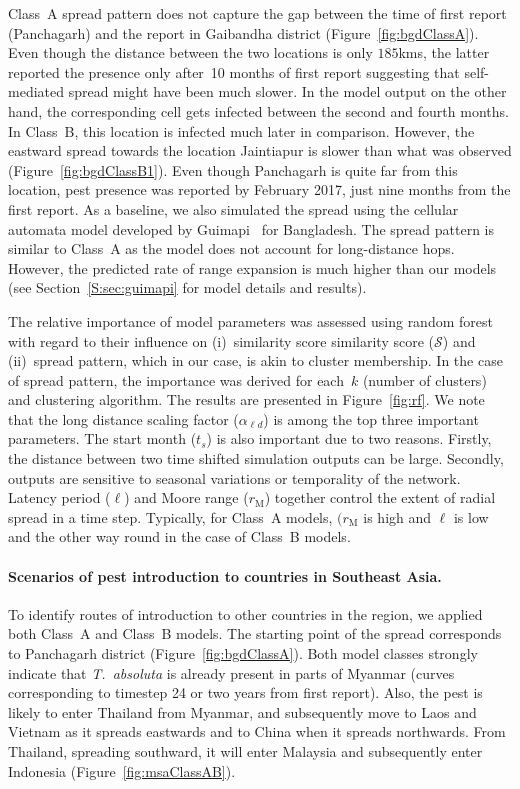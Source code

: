 \documentclass[11pt]{article}
\newcommand{\tuta}{\emph{T.~absoluta}}
\newcommand{\similarity}{\mathcal{S}}
\newcommand{\ald}{\alpha_{\ell d}}
\newcommand{\mooreRange}{r_\mathrm{M}}
\theoremstyle{definition}
\begin{document}
Class~A spread pattern does not capture the gap between the time of first
report (Panchagarh) and the report in Gaibandha district
(Figure~\ref{fig:bgdClassA}). Even though the distance between the two
locations is only $185$kms, the latter reported the presence only after~10
months of first report suggesting that self-mediated spread might have been
much slower. In the model output on the other hand, the corresponding cell
gets infected between the second and fourth months.  In Class~B, this
location is infected much later in comparison. However, the eastward spread
towards the location Jaintiapur is slower than what was observed
(Figure~\ref{fig:bgdClassB1}). Even though Panchagarh is quite far from
this location, pest presence was reported by February 2017, just nine
months from the first report.  As a baseline, we also simulated the spread
using the cellular automata model developed by
Guimapi~\cite{guimapi2016modeling} for Bangladesh. The spread pattern is
similar to Class~A as the model does not account for long-distance hops.
However, the predicted rate of range expansion is much higher than our
models (see Section~\ref{S:sec:guimapi} for model details and results).

The relative importance of model parameters was assessed using random
forest~\cite{breiman2001random} with regard to their influence on
(i)~similarity score similarity score ($\similarity$) and (ii)~spread
pattern, which in our case, is akin to cluster membership. In the case of
spread pattern, the importance was derived for each~$k$ (number of
clusters) and clustering algorithm. The results are presented in
Figure~\ref{fig:rf}. We note that the long distance scaling factor ($\ald$)
is among the top three important parameters. The start month ($t_s$) is
also important due to two reasons. Firstly, the distance between two time
shifted simulation outputs can be large. Secondly, outputs are sensitive to
seasonal variations or temporality of the network.  Latency period ($\ell$)
and Moore range ($\mooreRange$) together control the extent of radial
spread in a time step. Typically, for Class~A models, $(\mooreRange$ is
high and $\ell$ is low and the other way round in the case of Class~B
models.

\paragraph{Scenarios of pest introduction to countries in Southeast Asia.}
To identify routes of introduction to other countries in the region, we
applied both Class~A and Class~B models. The starting point of the spread
corresponds to Panchagarh district (Figure~\ref{fig:bgdClassA}). Both model
classes strongly indicate that \tuta{} is already present in parts of
Myanmar (curves corresponding to timestep 24 or two years from first
report). Also, the pest is likely to enter Thailand from Myanmar, and
subsequently move to Laos and Vietnam as it spreads eastwards and to China
when it spreads northwards. From Thailand, spreading southward, it will
enter Malaysia and subsequently enter Indonesia
(Figure~\ref{fig:msaClassAB}).
\end{document}
